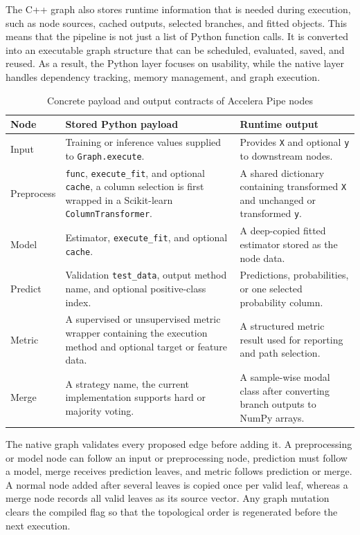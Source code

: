 The C++ graph also stores runtime information that is needed during execution,
such as node sources, cached outputs, selected branches, and fitted objects.
This means that the pipeline is not just a list of Python function calls. It is
converted into an executable graph structure that can be scheduled, evaluated,
saved, and reused. As a result, the Python layer focuses on usability, while the
native layer handles dependency tracking, memory management, and graph execution.


\begin{table}[H]
\centering
\small
\renewcommand{\arraystretch}{1.12}
\setlength{\tabcolsep}{4pt}
\caption{Concrete payload and output contracts of Accelera Pipe nodes}
\label{tab:node-runtime-contracts}
\begin{tabularx}{\textwidth}{p{}p{}X}
\toprule
\textbf{Node} & \textbf{Stored Python payload} & \textbf{Runtime output} \\
\midrule
Input & Training or inference values supplied to \texttt{Graph.execute}. &
Provides \texttt{X} and optional \texttt{y} to downstream nodes. \\
\midrule
Preprocess & \texttt{func}, \texttt{execute\_fit}, and optional
\texttt{cache}, a column selection is first wrapped in a Scikit-learn
\texttt{ColumnTransformer}. & A shared dictionary containing transformed
\texttt{X} and unchanged or transformed \texttt{y}. \\
\midrule
Model & Estimator, \texttt{execute\_fit}, and optional \texttt{cache}. & A
deep-copied fitted estimator stored as the node data. \\
\midrule
Predict & Validation \texttt{test\_data}, output method name, and optional
positive-class index. & Predictions, probabilities, or one selected probability
column. \\
\midrule
Metric & A supervised or unsupervised metric wrapper containing the execution
method and optional target or feature data. & A structured metric result used
for reporting and path selection. \\
\midrule
Merge & A strategy name, the current implementation supports hard or majority
voting. & A sample-wise modal class after converting branch outputs to NumPy
arrays. \\
\bottomrule
\end{tabularx}
\end{table}

The native graph validates every proposed edge before adding it. A preprocessing
or model node can follow an input or preprocessing node, prediction must follow
a model, merge receives prediction leaves, and metric follows prediction or
merge. A normal node added after several leaves is copied once per valid leaf,
whereas a merge node records all valid leaves as its source vector. Any graph
mutation clears the compiled flag so that the topological order is regenerated
before the next execution.

